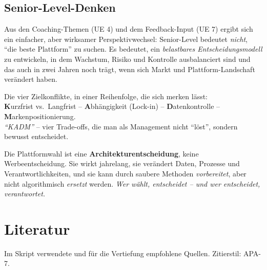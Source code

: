 \documentclass[11pt,a4paper,oneside]{article}
\newcommand{\caveatfontfallback}{\itshape}
\newcommand\caveatfont{\caveatfontfallback}%
\newcommand{\akzent}[1]{{\caveatfont\color{lpAmber}#1}}
\begin{document}
\subsection{Senior-Level-Denken}

Aus den Coaching-Themen (UE 4) und dem Feedback-Input (UE 7) ergibt sich ein einfacher, aber wirksamer Perspektivwechsel: Senior-Level bedeutet \emph{nicht}, ``die beste Plattform'' zu suchen. Es bedeutet, ein \emph{belastbares Entscheidungsmodell} zu entwickeln, in dem Wachstum, Risiko und Kontrolle ausbalanciert sind und das auch in zwei Jahren noch trägt, wenn sich Markt und Plattform-Landschaft verändert haben.

\begin{eselsbox}[Eselsbrücke: \akzent{K-A-D-M}]
Die vier Zielkonflikte, in einer Reihenfolge, die sich merken lässt:\\[2pt]
\textbf{K}urzfrist vs.\ Langfrist -- \textbf{A}bhängigkeit (Lock-in) -- \textbf{D}atenkontrolle -- \textbf{M}arkenpositionierung.\\[2pt]
\emph{``KADM''} -- vier Trade-offs, die man als Management nicht ``löst'', sondern bewusst entscheidet.
\end{eselsbox}

\begin{merkbox}
Die Plattformwahl ist eine \textbf{Architekturentscheidung}, keine Werbeentscheidung. Sie wirkt jahrelang, sie verändert Daten, Prozesse und Verantwortlichkeiten, und sie kann durch saubere Methoden \emph{vorbereitet}, aber nicht algorithmisch \emph{ersetzt} werden. \emph{Wer wählt, entscheidet -- und wer entscheidet, verantwortet.}
\end{merkbox}

\clearpage
\section{Literatur}

Im Skript verwendete und für die Vertiefung empfohlene Quellen. Zitierstil: APA-7.
\end{document}
